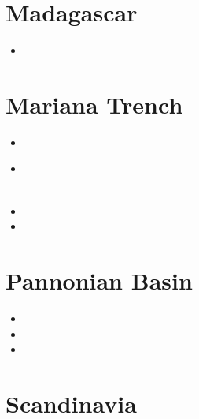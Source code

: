 \section{Madagascar}

\begin{scriptsize}
\begin{itemize}
\item[\twothousandtwenty]
\end{itemize}
\end{scriptsize}

\section{Mariana Trench}

\begin{scriptsize}
\begin{itemize}
\item[\nineteenninetytwo]
\item[\twothousandfifteen]
\\
\\
\item[\twothousandeighteen]
\item[\twothousandtwentythree]
\end{itemize}
\end{scriptsize}

\section{Pannonian Basin}

\begin{scriptsize}
\begin{itemize}
\item[\twothousandone]
\item[\twothousandtwo]
\item[\twothousandtwentyone]
\end{itemize}
\end{scriptsize}

\section{Scandinavia}

